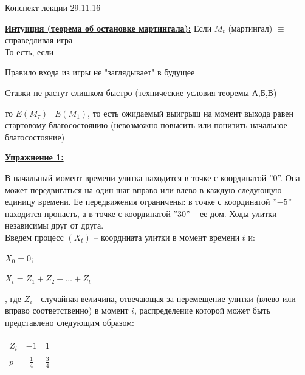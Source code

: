 \documentclass[a4paper]{article}
\begin{document}
 \begin{center}
 {\Large{Конспект лекции 29.11.16}}
 \end{center}
 \par {\bf\underline{Интуиция (теорема об остановке мартингала):}} Если ${M}_t$ (мартингал) $\equiv$ справедливая игра \\ То есть, если \begin{enumerate*}[label={\alph*)},font={\color{red!50!black}\bfseries}] \item Правило входа из игры не "заглядывает" в будущее \item Ставки не растут слишком быстро (технические условия теоремы А,Б,В) \end{enumerate*} то $E({M}_\tau)$=$E({M}_1)$, то есть ожидаемый выигрыш на момент выхода равен стартовому благосостоянию (невозможно повысить или понизить начальное благосостояние)
 \\
 \par {\bf\underline{Упражнение 1:}}
\begin{figure}[h]
\label{image}
\end{figure}
В начальный момент времени улитка находится в точке с координатой ''$0$''. Она может передвигаться на один шаг вправо или влево в каждую следующую единицу времени. Ее передвижения ограничены: в точке с координатой ''$-5$'' находится пропасть, а в точке с координатой ''$30$'' -- ее дом.
 Ходы улитки независимы друг от друга. \\
 Введем процесс $({X}_t)$ -- координата улитки в момент времени $t$ и: \begin{enumerate*}[font={\color{red!50!black}\bfseries}] \item ${X}_0=0$; \item ${X}_t={Z}_1+{Z}_2+\dots+{Z}_t$ \end{enumerate*}, где ${Z}_i$ - случайная величина, отвечающая за перемещение улитки (влево или вправо соответственно) в момент $i$, распределение которой может быть представлено следующим образом:
\begin{table}[h]
\centering
\begin{tabular}{l|c|c}
${Z}_i$ & $-1$ & $1$ \\ \hline
$p$ & $\frac{1}{4}$ & $\frac{3}{4}$
\end{tabular}
\end{table}
\end{document}
